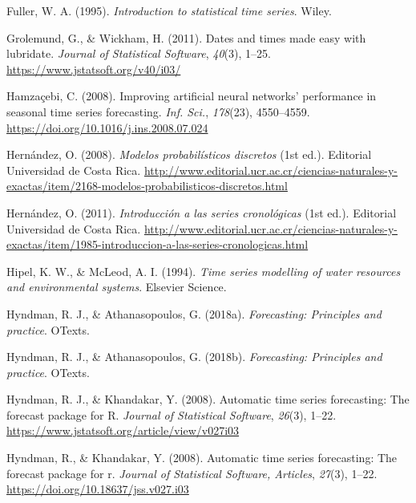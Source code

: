 \documentclass[
]{article}
\newlength{\cslhangindent}
\newlength{\cslentryspacingunit} %
\newenvironment{CSLReferences}[2] %
 {%
  \setlength{\parindent}{0pt}
  \ifodd #1
  \let\oldpar\par
  \def\par{\hangindent=\cslhangindent\oldpar}
  \fi
  \setlength{\parskip}{#2\cslentryspacingunit}
 }%
 {}
\begin{document}
\begin{CSLReferences}{1}{0}
\leavevmode{}%
Fuller, W. A. (1995). \emph{Introduction to statistical time series}.
Wiley.

\leavevmode{}%
Grolemund, G., \& Wickham, H. (2011). Dates and times made easy with
{lubridate}. \emph{Journal of Statistical Software}, \emph{40}(3),
1--25. \url{https://www.jstatsoft.org/v40/i03/}

\leavevmode{}%
Hamzaçebi, C. (2008). Improving artificial neural networks' performance
in seasonal time series forecasting. \emph{Inf. Sci.}, \emph{178}(23),
4550--4559. \url{https://doi.org/10.1016/j.ins.2008.07.024}

\leavevmode{}%
Hernández, O. (2008). \emph{Modelos probabilísticos discretos} (1st
ed.). Editorial Universidad de Costa Rica.
\url{http://www.editorial.ucr.ac.cr/ciencias-naturales-y-exactas/item/2168-modelos-probabilisticos-discretos.html}

\leavevmode{}%
Hernández, O. (2011). \emph{Introducción a las series cronológicas} (1st
ed.). Editorial Universidad de Costa Rica.
\url{http://www.editorial.ucr.ac.cr/ciencias-naturales-y-exactas/item/1985-introduccion-a-las-series-cronologicas.html}

\leavevmode{}%
Hipel, K. W., \& McLeod, A. I. (1994). \emph{Time series modelling of
water resources and environmental systems}. Elsevier Science.

\leavevmode{}%
Hyndman, R. J., \& Athanasopoulos, G. (2018a). \emph{Forecasting:
Principles and practice}. OTexts.

\leavevmode{}%
Hyndman, R. J., \& Athanasopoulos, G. (2018b). \emph{Forecasting:
Principles and practice}. OTexts.

\leavevmode{}%
Hyndman, R. J., \& Khandakar, Y. (2008). Automatic time series
forecasting: The forecast package for {R}. \emph{Journal of Statistical
Software}, \emph{26}(3), 1--22.
\url{https://www.jstatsoft.org/article/view/v027i03}

\leavevmode{}%
Hyndman, R., \& Khandakar, Y. (2008). Automatic time series forecasting:
The forecast package for r. \emph{Journal of Statistical Software,
Articles}, \emph{27}(3), 1--22.
\url{https://doi.org/10.18637/jss.v027.i03}


\end{CSLReferences}
\end{document}
